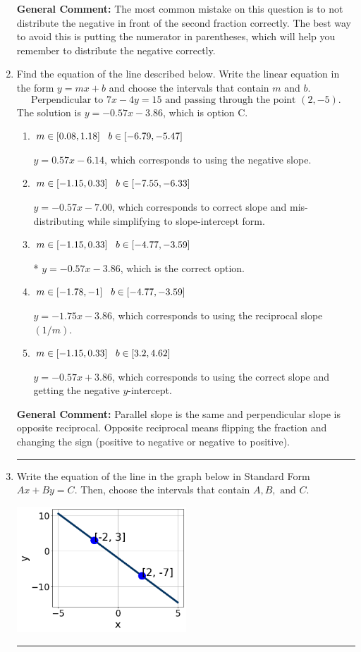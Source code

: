 \documentclass{extbook}[14pt]
\newcommand{\litem}[1]{\item #1

\rule{\textwidth}{0.4pt}}
\begin{document}
\begin{enumerate}
{\textbf{General Comment:} The most common mistake on this question is to not distribute the negative in front of the second fraction correctly. The best way to avoid this is putting the numerator in parentheses, which will help you remember to distribute the negative correctly.
}
\litem{
Find the equation of the line described below. Write the linear equation in the form $ y=mx+b $ and choose the intervals that contain $m$ and $b$.
\[ \text{Perpendicular to } 7 x - 4 y = 15 \text{ and passing through the point } (2, -5). \]The solution is \( y = -0.57x - 3.86 \), which is option C.\begin{enumerate}[label=\Alph*.]
\item \( m \in [0.08, 1.18] \hspace*{3mm} b \in [-6.79, -5.47] \)

 $y = 0.57x - 6.14$, which corresponds to using the negative slope.
\item \( m \in [-1.15, 0.33] \hspace*{3mm} b \in [-7.55, -6.33] \)

 $y = -0.57x - 7.00$, which corresponds to correct slope and mis-distributing while simplifying to slope-intercept form.
\item \( m \in [-1.15, 0.33] \hspace*{3mm} b \in [-4.77, -3.59] \)

* $y = -0.57x - 3.86$, which is the correct option.
\item \( m \in [-1.78, -1] \hspace*{3mm} b \in [-4.77, -3.59] \)

 $y = -1.75x - 3.86$, which corresponds to using the reciprocal slope $(1/m)$.
\item \( m \in [-1.15, 0.33] \hspace*{3mm} b \in [3.2, 4.62] \)

 $y = -0.57x + 3.86$, which corresponds to using the correct slope and getting the negative $y$-intercept.
\end{enumerate}

\textbf{General Comment:} Parallel slope is the same and perpendicular slope is opposite reciprocal. Opposite reciprocal means flipping the fraction and changing the sign (positive to negative or negative to positive).
}
\litem{
Write the equation of the line in the graph below in Standard Form $Ax+By=C$. Then, choose the intervals that contain $A, B, \text{ and } C$.

\begin{center}
    \includegraphics[width=0.5\textwidth]{../Figures/linearGraphToStandardCopyB.png}
\end{center}


}
\end{enumerate}
\end{document}
